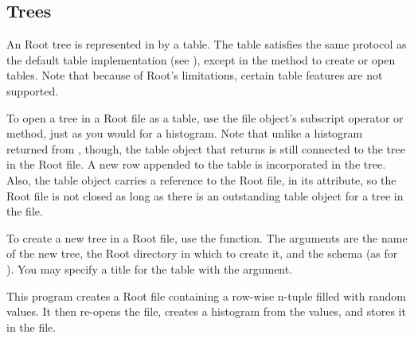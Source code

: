 \subsection{Trees}

An Root tree is represented in \pyhep by a table.  The table satisfies
the same protocol as the default table implementation (see
), except in the method to create or open tables.
Note that because of Root's limitations, certain table features are not
supported.

To open a tree in a Root file as a table, use the file object's
subscript operator or  method, just as you would for a
histogram.  Note that unlike a histogram returned from ,
though, the table object that  returns is still connected
to the tree in the Root file.  A new row appended to the table is
incorporated in the tree.  Also, the table object carries a reference to
the Root file, in its  attribute, so the Root file is not
closed as long as there is an outstanding table object for a tree in the
file.

To create a new tree in a Root file, use the
 function.  The arguments are the name of
the new tree, the Root directory in which to create it, and the schema
(as for ).  You may specify a title for the
table with the  argument.

This program creates a Root file containing a row-wise n-tuple filled
with random values.  It then re-opens the file, creates a histogram from
the values, and stores it in the file.

